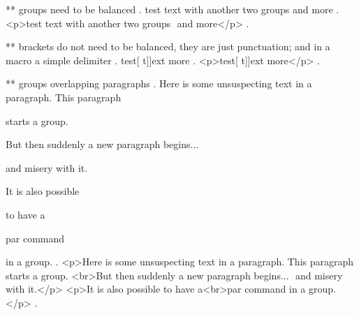 ** groups need to be balanced
.
test {text with {{another }two} groups } and more
.
<p>test text with another two​ groups ​ and more</p>
.


** brackets do not need to be balanced, they are just punctuation; and in a macro a simple delimiter
.
test[ {t]]ext} more
.
<p>test[ t]]ext​ more</p>
.


** groups overlapping paragraphs
.
Here is some unsuspecting text in a paragraph. This paragraph { starts a group.

But then suddenly a new paragraph begins... } and misery with it.

It is also possible {to have a\par par command} in a group.
.
<p>Here is some unsuspecting text in a paragraph. This paragraph ​ starts a group.
<br>But then suddenly a new paragraph begins... ​ and misery with it.</p>
<p>It is also possible to have a<br>par command​ in a group.</p>
.
